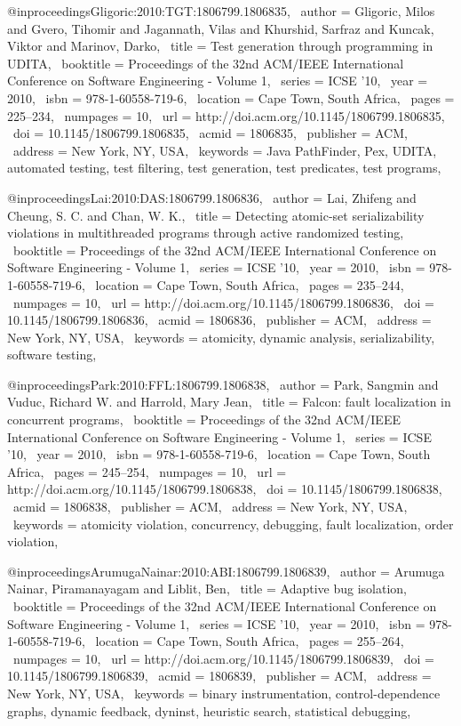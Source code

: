@inproceedings{Gligoric:2010:TGT:1806799.1806835,
 author = {Gligoric, Milos and Gvero, Tihomir and Jagannath, Vilas and Khurshid, Sarfraz and Kuncak, Viktor and Marinov, Darko},
 title = {Test generation through programming in UDITA},
 booktitle = {Proceedings of the 32nd ACM/IEEE International Conference on Software Engineering - Volume 1},
 series = {ICSE '10},
 year = {2010},
 isbn = {978-1-60558-719-6},
 location = {Cape Town, South Africa},
 pages = {225--234},
 numpages = {10},
 url = {http://doi.acm.org/10.1145/1806799.1806835},
 doi = {10.1145/1806799.1806835},
 acmid = {1806835},
 publisher = {ACM},
 address = {New York, NY, USA},
 keywords = {Java PathFinder, Pex, UDITA, automated testing, test filtering, test generation, test predicates, test programs},
} 

@inproceedings{Lai:2010:DAS:1806799.1806836,
 author = {Lai, Zhifeng and Cheung, S. C. and Chan, W. K.},
 title = {Detecting atomic-set serializability violations in multithreaded programs through active randomized testing},
 booktitle = {Proceedings of the 32nd ACM/IEEE International Conference on Software Engineering - Volume 1},
 series = {ICSE '10},
 year = {2010},
 isbn = {978-1-60558-719-6},
 location = {Cape Town, South Africa},
 pages = {235--244},
 numpages = {10},
 url = {http://doi.acm.org/10.1145/1806799.1806836},
 doi = {10.1145/1806799.1806836},
 acmid = {1806836},
 publisher = {ACM},
 address = {New York, NY, USA},
 keywords = {atomicity, dynamic analysis, serializability, software testing},
} 

@inproceedings{Park:2010:FFL:1806799.1806838,
 author = {Park, Sangmin and Vuduc, Richard W. and Harrold, Mary Jean},
 title = {Falcon: fault localization in concurrent programs},
 booktitle = {Proceedings of the 32nd ACM/IEEE International Conference on Software Engineering - Volume 1},
 series = {ICSE '10},
 year = {2010},
 isbn = {978-1-60558-719-6},
 location = {Cape Town, South Africa},
 pages = {245--254},
 numpages = {10},
 url = {http://doi.acm.org/10.1145/1806799.1806838},
 doi = {10.1145/1806799.1806838},
 acmid = {1806838},
 publisher = {ACM},
 address = {New York, NY, USA},
 keywords = {atomicity violation, concurrency, debugging, fault localization, order violation},
} 

@inproceedings{ArumugaNainar:2010:ABI:1806799.1806839,
 author = {Arumuga Nainar, Piramanayagam and Liblit, Ben},
 title = {Adaptive bug isolation},
 booktitle = {Proceedings of the 32nd ACM/IEEE International Conference on Software Engineering - Volume 1},
 series = {ICSE '10},
 year = {2010},
 isbn = {978-1-60558-719-6},
 location = {Cape Town, South Africa},
 pages = {255--264},
 numpages = {10},
 url = {http://doi.acm.org/10.1145/1806799.1806839},
 doi = {10.1145/1806799.1806839},
 acmid = {1806839},
 publisher = {ACM},
 address = {New York, NY, USA},
 keywords = {binary instrumentation, control-dependence graphs, dynamic feedback, dyninst, heuristic search, statistical debugging},
} 

